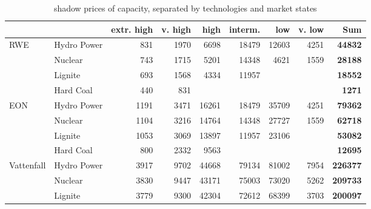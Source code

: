 \clearpage
\newpage
\begin{table}[htb]
\centering
\caption{shadow prices of capacity, separated by technologies and market states}
\begin{tabular}{llrrrrrrr}
\hline
           &            & extr. high &    v. high &       high &    interm. &        low &     v. low &  {\bf Sum} \\
\hline
       RWE & Hydro Power &        831 &       1970 &       6698 &      18479 &      12603 &       4251 & {\bf 44832} \\

           &    Nuclear &        743 &       1715 &       5201 &      14348 &       4621 &       1559 & {\bf 28188} \\

           &    Lignite &        693 &       1568 &       4334 &      11957 &            &            & {\bf 18552} \\

           &  Hard Coal &        440 &        831 &            &            &            &            & {\bf 1271} \\
\hline
       EON & Hydro Power &       1191 &       3471 &      16261 &      18479 &      35709 &       4251 & {\bf 79362} \\

           &    Nuclear &       1104 &       3216 &      14764 &      14348 &      27727 &       1559 & {\bf 62718} \\

           &    Lignite &       1053 &       3069 &      13897 &      11957 &      23106 &            & {\bf 53082} \\

           &  Hard Coal &        800 &       2332 &       9563 &            &            &            & {\bf 12695} \\
\hline
Vattenfall & Hydro Power &       3917 &       9702 &      44668 &      79134 &      81002 &       7954 & {\bf 226377} \\

           &    Nuclear &       3830 &       9447 &      43171 &      75003 &      73020 &       5262 & {\bf 209733} \\

           &    Lignite &       3779 &       9300 &      42304 &      72612 &      68399 &       3703 & {\bf 200097} \\


\end{tabular}
\end{table}
